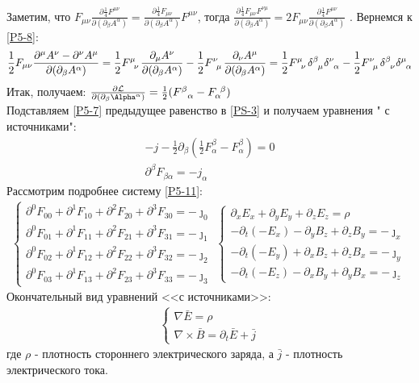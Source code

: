\documentclass[__main__.tex]{subfiles}
\begin{document}
Заметим, что 
$F_{\mu\nu}\frac{\partial\frac{1}{4}F^{\mu\nu}}{\partial(\partial_\beta A^\alpha)}=\frac{\partial\frac{1}{4}F_{\mu\nu}}{\partial(\partial_\beta A^\alpha)}F^{\mu\nu}$, тогда $\frac{\partial\frac{1}{4}F_{\mu\nu}F^{\nu\mu}}{\partial(\partial_\beta A^\alpha)}=2F_{\mu\nu}\frac{\partial\frac{1}{4}F^{\mu\nu}}{\partial(\partial_\beta A^\alpha)}$
. Вернемся к \ref{P5-8}:\\
\begin{gather}
\label{P5-9}
\frac{1}{2}F_{\mu\nu}\frac{\partial^\mu A^\nu-\partial^\nu A^\mu}{{\partial(\partial_\beta A^\alpha)}}=
\frac{1}{2}F\indices{^{\mu}_\nu}\frac{\partial_\mu A^\nu}{{\partial(\partial_\beta A^\alpha)}}-\frac{1}{2}F\indices{^{\nu}_\mu}\frac{\partial_\nu A^\mu}{{\partial(\partial_\beta A^\alpha)}}=
\frac{1}{2}\tensor{F}{^{\mu}_\nu}\tensor{\delta}{^{\beta}_\mu}\tensor{\delta}{^{\nu}_\alpha}-\frac{1}{2}\tensor{F}{^{\nu}_\mu}\tensor{\delta}{^{\beta}_\nu}\tensor{\delta}{^{\mu}_\alpha}
\end{gather}
Итак, получаем:
$\frac{\partial \mathcal{L}}{\partial(\partial_\beta\Alpha^\alpha)}=
\frac{1}{2}(F^\beta_{\ \ \alpha}-F_\alpha^{\ \beta})$
\\
Подставляем \ref{P5-7} предыдущее равенство в \ref{PS-3} и получаем уравнения " с источниками":\\
\begin{gather}
\label{P5-10}
-j-\frac{1}{2}\partial_\beta(\frac{1}{2}F^\beta_\alpha-F_\alpha^\beta)=0\\
\label{P5-11}
\partial^\beta F_{\beta\alpha}=-j_\alpha
\end{gather}
Рассмотрим подробнее систему \ref{P5-11}:\\
\begin{gather}
\label{P5-12}
\begin{cases}
\partial^0F_{00}+\partial^1F_{10}+\partial^2F_{20}+\partial^3F_{30}=-\jmath_0\\
\partial^0F_{01}+\partial^1F_{11}+\partial^2F_{21}+\partial^3F_{31}=-\jmath_1\\
\partial^0F_{02}+\partial^1F_{12}+\partial^2F_{22}+\partial^3F_{32}=-\jmath_2\\
\partial^0F_{03}+\partial^1F_{13}+\partial^2F_{23}+\partial^3F_{33}=-\jmath_3
\end{cases}
\begin{cases}
\partial_xE_x+\partial_yE_y+\partial_zE_z=\rho\\
-\partial_t(-E_x)-\partial_yB_z+\partial_zB_y=-\jmath_x\\
-\partial_t(-E_y)+\partial_xB_z+\partial_zB_x=-\jmath_y\\
-\partial_t(-E_z)-\partial_xB_y+\partial_yB_x=-\jmath_z
\end{cases}
\end{gather}
Окончательный вид уравнений <<с источниками>>:\\
\begin{gather}
\label{P5-13}
\begin{cases}
\nabla\bar{E}=\rho\\
\nabla\times\bar{B}=\partial_t\bar{E}+\bar{j}
\end{cases}
\end{gather}
где $\rho$ - плотность стороннего электрического заряда, а $\bar{j}$ - плотность электрического тока.
\end{document}

